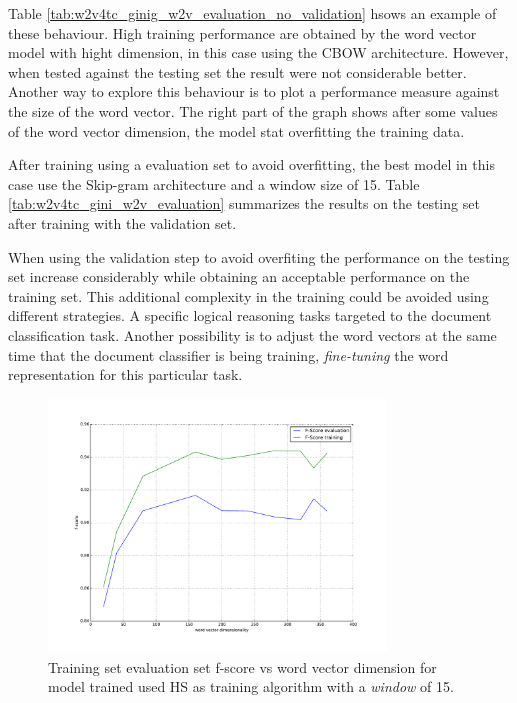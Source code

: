 Table \ref{tab:w2v4tc_ginig_w2v_evaluation_no_validation} hsows  an example
of these behaviour. High training performance are obtained by the word vector
model with hight dimension, in this case using the \ac{CBOW} architecture.
However, when tested against the testing set the result were not considerable
better. Another way to explore this behaviour is to plot a performance
measure against the size of the word vector. The right part of the graph
shows after some values of the word vector dimension, the model stat
overfitting the training data.


After training using a evaluation set to avoid overfitting, the best model in
this case use the Skip-gram architecture and a window size of 15. Table
\ref{tab:w2v4tc_gini_w2v_evaluation} summarizes the results on the testing
set after training with the validation set.

When using the validation step to avoid overfiting the performance on the
testing set increase considerably while obtaining an acceptable performance
on the training set. This additional complexity in the training could be
avoided using different strategies. A specific logical reasoning tasks
targeted to the document classification task. Another possibility is to
adjust the word vectors at the same time that the document classifier is
being training,   \textit{fine-tuning} the word representation for this
particular task.


\begin{figure}[!h]
    \centering
    \includegraphics[width=0.80\textwidth]{images/005-fscore-vs-training-size.pdf}
    \caption{Training set  evaluation set f-score vs word vector dimension
      for model trained used \ac{HS} as training algorithm with a \textit{window} of 15.}
    \label{fig:fscore-vs-size-dmr}
\end{figure}



